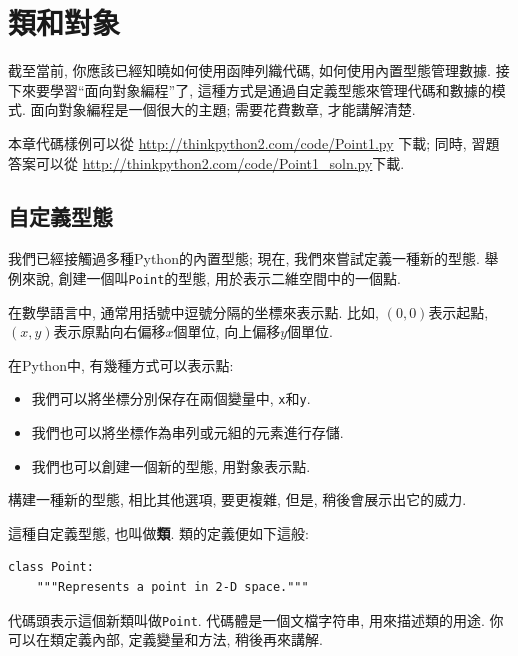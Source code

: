\documentclass[10pt]{book}
\begin{document}
\chapter{類和對象}
\label{clobjects}

截至當前, 你應該已經知曉如何使用函陣列織代碼, 
如何使用內置型態管理數據. 
接下來要學習``面向對象編程''了, 
這種方式是通過自定義型態來管理代碼和數據的模式. 
面向對象編程是一個很大的主題; 需要花費數章, 才能講解清楚. 

本章代碼樣例可以從
\url{http://thinkpython2.com/code/Point1.py} 下載;
同時, 習題答案可以從
\url{http://thinkpython2.com/code/Point1_soln.py}下載.


\section{自定義型態}
\label{point}

我們已經接觸過多種Python的內置型態;
現在, 我們來嘗試定義一種新的型態. 
舉例來說, 創建一個叫{\tt Point}的型態, 用於表示二維空間中的一個點. 

在數學語言中, 通常用括號中逗號分隔的坐標來表示點. 
比如, $(0,0)$表示起點, $(x,y)$表示原點向右偏移$x$個單位, 
向上偏移$y$個單位. 

在Python中, 有幾種方式可以表示點:

\begin{itemize}

\item 我們可以將坐標分別保存在兩個變量中, {\tt x}和{\tt y}. 

\item 我們也可以將坐標作為串列或元組的元素進行存儲. 

\item 我們也可以創建一個新的型態, 用對象表示點. 

\end{itemize}

構建一種新的型態, 相比其他選項, 要更複雜, 
但是, 稍後會展示出它的威力. 

這種自定義型態, 也叫做{\bf 類}. 
類的定義便如下這般:

\begin{verbatim}
class Point:
    """Represents a point in 2-D space."""
\end{verbatim}
%
代碼頭表示這個新類叫做{\tt Point}. 
代碼體是一個文檔字符串, 用來描述類的用途. 
你可以在類定義內部, 定義變量和方法, 
稍後再來講解. 
\end{document}
